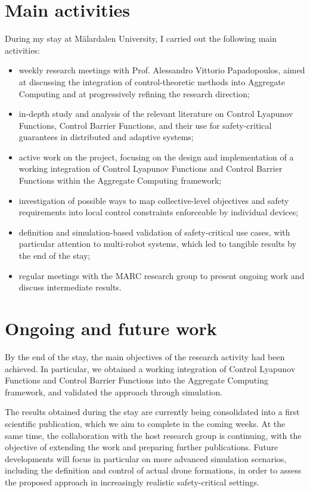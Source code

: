 \documentclass[12pt]{article}
\begin{document}
\section{Main activities}
During my stay at Mälardalen University, I carried out the following main activities:
\begin{itemize}
    \item weekly research meetings with Prof. Alessandro Vittorio Papadopoulos,
    aimed at discussing the integration of control-theoretic methods into Aggregate Computing
    and at progressively refining the research direction;
    \item in-depth study and analysis of the relevant literature on Control Lyapunov Functions,
    Control Barrier Functions, and their use for safety-critical guarantees in distributed and
    adaptive systems;
    \item active work on the project, focusing on the design and implementation of a working
    integration of Control Lyapunov Functions and Control Barrier Functions within the Aggregate
    Computing framework;
    \item investigation of possible ways to map collective-level objectives and safety requirements
    into local control constraints enforceable by individual devices;
    \item definition and simulation-based validation of safety-critical use cases, with particular
    attention to multi-robot systems, which led to tangible results by the end of the stay;
    \item regular meetings with the MARC research group to present ongoing work and discuss
    intermediate results.
\end{itemize}

\section{Ongoing and future work}
By the end of the stay,
the main objectives of the research activity had been achieved.
%
In particular,
we obtained a working integration of Control Lyapunov Functions and Control Barrier Functions
into the Aggregate Computing framework,
and validated the approach through simulation.

The results obtained during the stay are currently being consolidated into a first scientific publication,
which we aim to complete in the coming weeks.
%
At the same time,
the collaboration with the host research group is continuing,
with the objective of extending the work and preparing further publications.
%
Future developments will focus in particular on more advanced simulation scenarios,
including the definition and control of actual drone formations,
in order to assess the proposed approach in increasingly realistic safety-critical settings.


%
%
\end{document}
